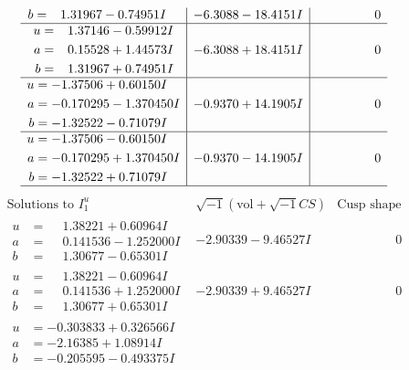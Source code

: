 \documentclass[1p]{elsarticle_modified}
\theoremstyle{definition}
\newcommand{\I}{\sqrt{-1}}
\begin{document}
$$\begin{array}{c|c|c}
\begin{aligned}
b &= \phantom{-}1.31967 - 0.74951 I\end{aligned}
 & -6.3088 - 18.4151 I & \phantom{-0.000000 } 0 \\ \hline\begin{aligned}
u &= \phantom{-}1.37146 - 0.59912 I \\
a &= \phantom{-}0.15528 + 1.44573 I \\
b &= \phantom{-}1.31967 + 0.74951 I\end{aligned}
 & -6.3088 + 18.4151 I & \phantom{-0.000000 } 0 \\ \hline\begin{aligned}
u &= -1.37506 + 0.60150 I \\
a &= -0.170295 - 1.370450 I \\
b &= -1.32522 - 0.71079 I\end{aligned}
 & -0.9370 + 14.1905 I & \phantom{-0.000000 } 0 \\ \hline\begin{aligned}
u &= -1.37506 - 0.60150 I \\
a &= -0.170295 + 1.370450 I \\
b &= -1.32522 + 0.71079 I\end{aligned}
 & -0.9370 - 14.1905 I & \phantom{-0.000000 } 0\\
 \hline 
 \end{array}$$\newpage$$\begin{array}{c|c|c}  
\text{Solutions to }I^u_{1}& \I (\text{vol} + \sqrt{-1}CS) & \text{Cusp shape}\\
 \hline 
\begin{aligned}
u &= \phantom{-}1.38221 + 0.60964 I \\
a &= \phantom{-}0.141536 - 1.252000 I \\
b &= \phantom{-}1.30677 - 0.65301 I\end{aligned}
 & -2.90339 - 9.46527 I & \phantom{-0.000000 } 0 \\ \hline\begin{aligned}
u &= \phantom{-}1.38221 - 0.60964 I \\
a &= \phantom{-}0.141536 + 1.252000 I \\
b &= \phantom{-}1.30677 + 0.65301 I\end{aligned}
 & -2.90339 + 9.46527 I & \phantom{-0.000000 } 0 \\ \hline\begin{aligned}
u &= -0.303833 + 0.326566 I \\
a &= -2.16385 + 1.08914 I \\
b &= -0.205595 - 0.493375 I\end{aligned}

\end{array}$$
\end{document}
